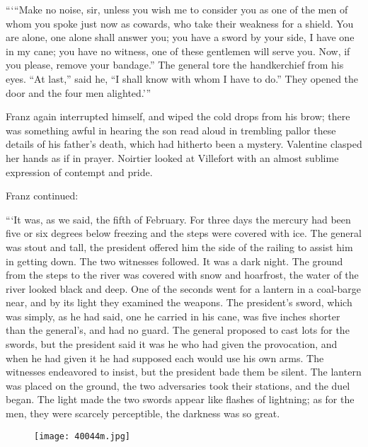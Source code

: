 “‘“Make no noise, sir, unless you wish me to consider you as one of the
men of whom you spoke just now as cowards, who take their weakness for
a shield. You are alone, one alone shall answer you; you have a sword
by your side, I have one in my cane; you have no witness, one of these
gentlemen will serve you. Now, if you please, remove your bandage.” The
general tore the handkerchief from his eyes. “At last,” said he, “I
shall know with whom I have to do.” They opened the door and the four
men alighted.’”

Franz again interrupted himself, and wiped the cold drops from his
brow; there was something awful in hearing the son read aloud in
trembling pallor these details of his father’s death, which had
hitherto been a mystery. Valentine clasped her hands as if in prayer.
Noirtier looked at Villefort with an almost sublime expression of
contempt and pride.

Franz continued:

“‘It was, as we said, the fifth of February. For three days the mercury
had been five or six degrees below freezing and the steps were covered
with ice. The general was stout and tall, the president offered him the
side of the railing to assist him in getting down. The two witnesses
followed. It was a dark night. The ground from the steps to the river
was covered with snow and hoarfrost, the water of the river looked
black and deep. One of the seconds went for a lantern in a coal-barge
near, and by its light they examined the weapons. The president’s
sword, which was simply, as he had said, one he carried in his cane,
was five inches shorter than the general’s, and had no guard. The
general proposed to cast lots for the swords, but the president said it
was he who had given the provocation, and when he had given it he had
supposed each would use his own arms. The witnesses endeavored to
insist, but the president bade them be silent. The lantern was placed
on the ground, the two adversaries took their stations, and the duel
began. The light made the two swords appear like flashes of lightning;
as for the men, they were scarcely perceptible, the darkness was so
great.

\begin{figure}[ht]
\texttt{[image: 40044m.jpg]}
\end{figure}

